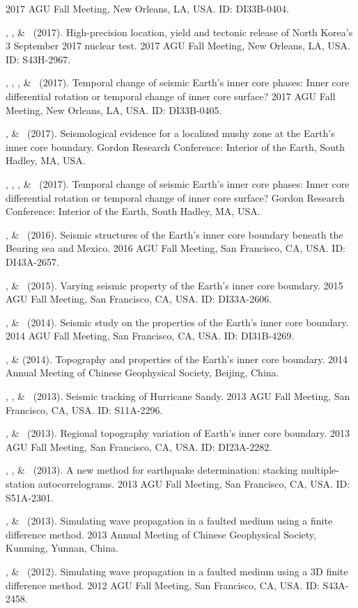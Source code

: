 \begin{etaremune}
    2017 AGU Fall Meeting, New Orleans, LA, USA. ID: DI33B-0404.
\item
    \JYao, \Me, \& \LWen\ (2017).
    High-precision location, yield and tectonic release of North Korea's 3 September 2017 nuclear test.
    2017 AGU Fall Meeting, New Orleans, LA, USA. ID: S43H-2967.
\item
    \JYao, \Me, \LSun, \& \LWen\ (2017).
    Temporal change of seismic Earth's inner core phases: Inner core differential rotation or temporal change of inner core surface?
    2017 AGU Fall Meeting, New Orleans, LA, USA. ID: DI33B-0405.
\item
    \Me, \& \LWen\ (2017).
    Seismological evidence for a localized mushy zone at the Earth's inner core boundary.
    Gordon Research Conference: Interior of the Earth, South Hadley, MA, USA.
\item
    \JYao, \Me, \LSun, \& \LWen\ (2017).
    Temporal change of seismic Earth's inner core phases: Inner core differential rotation or temporal change of inner core surface?
    Gordon Research Conference: Interior of the Earth, South Hadley, MA, USA.
\item
    \Me, \& \LWen\ (2016).
    Seismic structures of the Earth's inner core boundary beneath the Bearing sea and Mexico.
    2016 AGU Fall Meeting, San Francisco, CA, USA. ID: DI43A-2657.
\item
    \Me, \& \LWen\ (2015).
    Varying seismic property of the Earth's inner core boundary.
    2015 AGU Fall Meeting, San Francisco, CA, USA. ID: DI33A-2606.
\item
    \Me, \& \LWen\ (2014).
    Seismic study on the properties of the Earth's inner core boundary.
    2014 AGU Fall Meeting, San Francisco, CA, USA. ID: DI31B-4269.
\item
    \Me, \& \LWen (2014).
    Topography and properties of the Earth's inner core boundary.
    2014 Annual Meeting of Chinese Geophysical Society, Beijing, China.
\item
    \XChen, \Me, \& \LWen\ (2013).
    Seismic tracking of Hurricane Sandy.
    2013 AGU Fall Meeting, San Francisco, CA, USA. ID: S11A-2296.
\item
    \Me, \& \LWen\ (2013).
    Regional topography variation of Earth's inner core boundary.
    2013 AGU Fall Meeting, San Francisco, CA, USA. ID: DI23A-2282.
\item
    \MZhang, \Me, \& \LWen\ (2013).
    A new method for earthquake determination: stacking multiple-station autocorrelograms.
    2013 AGU Fall Meeting, San Francisco, CA, USA. ID: S51A-2301.
\item
    \Me, \& \LWen\ (2013).
    Simulating wave propagation in a faulted medium using a finite difference method.
    2013 Annual Meeting of Chinese Geophysical Society, Kunming, Yunnan, China.
\item
    \Me, \& \LWen\ (2012).
    Simulating wave propagation in a faulted medium using a 3D finite difference method.
    2012 AGU Fall Meeting, San Francisco, CA, USA. ID: S43A-2458.
\end{etaremune}
